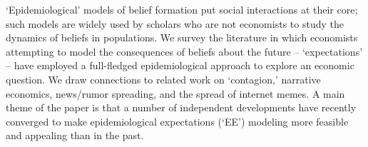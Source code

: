   `Epidemiological' models of belief formation put social interactions at their core; such models are widely used by scholars who are not economists to study the dynamics of beliefs in populations.  We survey the literature in which economists attempting to model the consequences of beliefs about the future -- `expectations' -- have employed a full-fledged epidemiological approach to explore an economic question.  We draw connections to related work on `contagion,' narrative economics, news/rumor spreading, and the spread of internet memes. A main theme of the paper is that a number of independent developments have recently converged to make epidemiological expectations (`EE') modeling more feasible and appealing than in the past.
